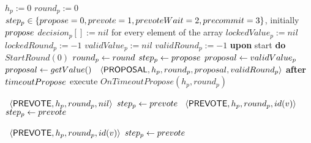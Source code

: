 \begin{algorithm}[htb!]
\def\baselinestretch{1}
\scriptsize\raggedright
\begin{algorithmic}[1]
	\SHORTSPACE
\INIT{}
\STATE $h_p := 0$ 
\STATE $round_p := 0$    
\STATE $step_p  \in \left\{propose=0, prevote=1, prevoteWait=2, precommit=3\right\}$, initially $propose$  
\STATE $decision_p[] := nil$ for every element of the array
\STATE $lockedValue_p := nil$
\STATE $lockedRound_p := -1$ 
\STATE $validValue_p := nil$
\STATE $validRound_p := -1$
\ENDINIT
\SHORTSPACE
\STATE \textbf{upon} start \textbf{do}  $StartRound(0)$
\SHORTSPACE
{} \label{line:tab:startRound}
	\STATE	$round_p \leftarrow round$
	\STATE	$step_p \leftarrow propose$
		 \label{line:tab:isThereLockedValue}
			\STATE $proposal \leftarrow validValue_p$
		\ELSE
			\STATE $proposal \leftarrow getValue()$ \label{line:tab:getValidValue}
		\ENDIF 	  
		\STATE \Broadcast\ $\langle\mathsf{PROPOSAL},h_p, round_p, proposal, validRound_p\rangle$  \label{line:tab:send-proposal}
	\ELSE
		\STATE \textbf{after} $timeoutPropose$ execute $OnTimeoutPropose(h_p, round_p)$ 
	\ENDIF
\ENDFUNCTION

\SPACE
{} \label{line:tab:recvProposal}			
   \label{line:tab:acceptProposal1}		
 	\STATE \Broadcast \ $\langle\mathsf{PREVOTE},h_p,round_p,nil\rangle$  \label{line:tab:prevote-nil}	
 	\STATE $step_p \leftarrow prevote$ \label{line:tab:setStateToPrevote1} 
  \label{line:tab:accept-proposal-2}
 	\STATE \Broadcast \ $\langle\mathsf{PREVOTE},h_p,round_p,id(v)\rangle$  \label{line:tab:prevote-proposal}	
 	\STATE $step_p \leftarrow prevote$ \label{line:tab:setStateToPrevote2} 
 \ENDIF
\ENDUPON

\SPACE
{} \label{line:tab:acceptProposal}
	 \label{line:tab:cond-prevote-higher-proposal}	
		\STATE \Broadcast \ $\langle\mathsf{PREVOTE},h_p,round_p,id(v)\rangle$  \label{line:tab:prevote-higher-proposal}	
		\STATE $step_p \leftarrow prevote$ \label{line:tab:setStateToPrevote3} 		 
	\ENDIF
\ENDUPON


\end{algorithmic}
\end{algorithm}
